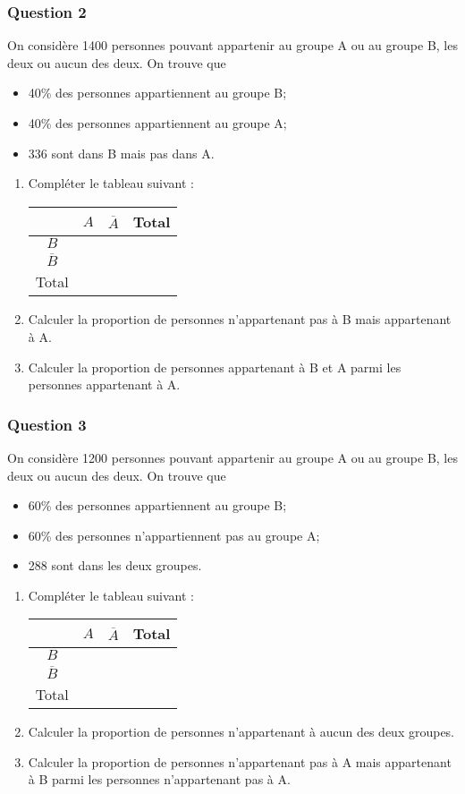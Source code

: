 \documentclass[15pt, mathserif]{beamer}
\begin{document}
\begin{frame} 
	\frametitle{Question 2}
On considère 1400 personnes pouvant appartenir au groupe A ou au groupe B, les deux ou aucun des deux. On trouve que 
 \begin{itemize} 
 \item 40\%  des personnes appartiennent au groupe B; 
 \item 40\% des personnes appartiennent au groupe A; 
 \item 336 sont dans B mais pas dans A.
 \end{itemize} 
 \begin{enumerate} 
 \item Compléter le tableau suivant : 
 \hfil \begin{tabular}{|c|c|c|c|} 
 \cline{2-4}   
 \multicolumn{1}{c|}{} & $A$ & $\overline{A}$ & Total\\ \hline 
 $B$  &    & &   \\\hline 
 $\overline{B}$   &  &    &    \\\hline	
 Total   & &  &  \\\hline  
 \end{tabular} 
 \item Calculer la proportion de personnes n'appartenant pas à B mais appartenant à A. 
 \item Calculer la proportion de personnes appartenant à B et A parmi les personnes appartenant à A. 
  \end{enumerate} 
 \end{frame}


\begin{frame} 
	\frametitle{Question 3}
On considère 1200 personnes pouvant appartenir au groupe A ou au groupe B, les deux ou aucun des deux. On trouve que 
 \begin{itemize} 
 \item 60\%  des personnes appartiennent au groupe B; 
 \item 60\% des personnes n'appartiennent pas au groupe A; 
 \item 288 sont dans les deux groupes.
 \end{itemize} 
 \begin{enumerate} 
 \item Compléter le tableau suivant : 
 \hfil \begin{tabular}{|c|c|c|c|} 
 \cline{2-4}   
 \multicolumn{1}{c|}{} & $A$ & $\overline{A}$ & Total\\ \hline 
 $B$  &    & &   \\\hline 
 $\overline{B}$   &  &    &    \\\hline	
 Total   & &  &  \\\hline  
 \end{tabular} 
 \item Calculer la proportion de personnes n'appartenant à aucun des deux groupes. 
 \item Calculer la proportion de personnes n'appartenant pas à A mais appartenant à B parmi les personnes n'appartenant pas à A. 
  \end{enumerate} 
 \end{frame}
\end{document}
